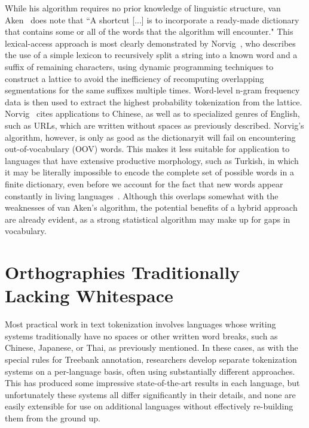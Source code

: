 While his algorithm requires no prior knowledge of linguistic structure, van Aken~\cite{aken11} does note that ``A shortcut [...] is to incorporate a ready-made dictionary that contains some or all of the words that the algorithm will encounter." This lexical-access approach is most clearly demonstrated by Norvig~\cite{norvig14}, who describes the use of a simple lexicon to recursively split a string into a known word and a suffix of remaining characters, using dynamic programming techniques to construct a lattice to avoid the inefficiency of recomputing overlapping segmentations for the same suffixes multiple times. Word-level n-gram frequency data is then used to extract the highest probability tokenization from the lattice. Norvig~\cite{norvig14} cites applications to Chinese, as well as to specialized genres of English, such as URLs, which are written without spaces as previously described.
Norvig's algorithm, however, is only as good as the dictionary\textemdash it will fail on encountering out-of-vocabulary (OOV) words. This makes it less suitable for application to languages that have extensive productive morphology, such as Turkish, in which it may be literally impossible to encode the complete set of possible words in a finite dictionary, even before we account for the fact that new words appear constantly in living languages~\cite{islam07}. Although this overlaps somewhat with the weaknesses of van Aken's algorithm, the potential benefits of a hybrid approach are already evident, as a strong statistical algorithm may make up for gaps in vocabulary.

\section{Orthographies Traditionally Lacking Whitespace}
Most practical work in text tokenization involves languages whose writing systems traditionally have no spaces or other written word breaks, such as Chinese, Japanese, or Thai, as previously mentioned. In these cases, as with the special rules for Treebank annotation, researchers develop separate tokenization systems on a per-language basis, often using substantially different approaches. This has produced some impressive state-of-the-art results in each language, but unfortunately these systems all differ significantly in their details, and none are easily extensible for use on additional languages without effectively re-building them from the ground up.

